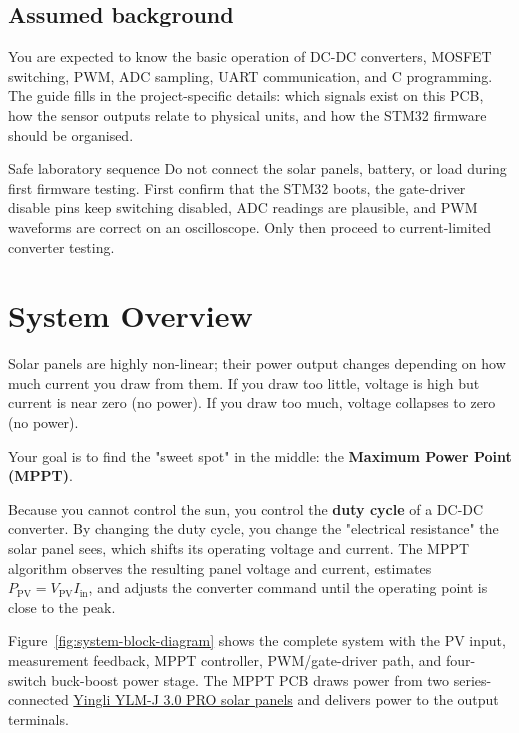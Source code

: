 \documentclass[11pt,a4paper]{article}
\newcommand{\Pin}{P_{\mathrm{PV}}}
\newcommand{\Iin}{I_{\mathrm{in}}}
\newcommand{\Vpv}{V_{\mathrm{PV}}}
\let\originalsection\section
\renewcommand{\section}{\clearpage\originalsection}
\begin{document}
\subsection{Assumed background}

You are expected to know the basic operation of DC-DC converters, MOSFET switching, PWM, ADC sampling, UART communication, and C programming. The guide fills in the project-specific details: which signals exist on this PCB, how the sensor outputs relate to physical units, and how the STM32 firmware should be organised.

\begin{warnbox}{Safe laboratory sequence}
Do not connect the solar panels, battery, or load during first firmware testing. First confirm that the STM32 boots, the gate-driver disable pins keep switching disabled, ADC readings are plausible, and PWM waveforms are correct on an oscilloscope. Only then proceed to current-limited converter testing.
\end{warnbox}

\section{System Overview}

Solar panels are highly non-linear; their power output changes depending on how much current you draw from them. If you draw too little, voltage is high but current is near zero (no power). If you draw too much, voltage collapses to zero (no power). 

Your goal is to find the "sweet spot" in the middle: the \textbf{Maximum Power Point (MPPT)}.

Because you cannot control the sun, you control the \textbf{duty cycle} of a DC-DC converter. By changing the duty cycle, you change the "electrical resistance" the solar panel sees, which shifts its operating voltage and current. The MPPT algorithm observes the resulting panel voltage and current, estimates $\Pin=\Vpv\Iin$, and adjusts the converter command until the operating point is close to the peak.

Figure~\ref{fig:system-block-diagram} shows the complete system with the PV input, measurement feedback, MPPT controller, PWM/gate-driver path, and four-switch buck-boost power stage. The MPPT PCB draws power from two series-connected \href{https://www.offgridtec.com/media/product_attachements/YingliSolar_410W\%20YLM-J\%203.0\%20PRO_Datasheet.pdf}{Yingli YLM-J 3.0 PRO solar panels} and delivers power to the output terminals. 
\end{document}
